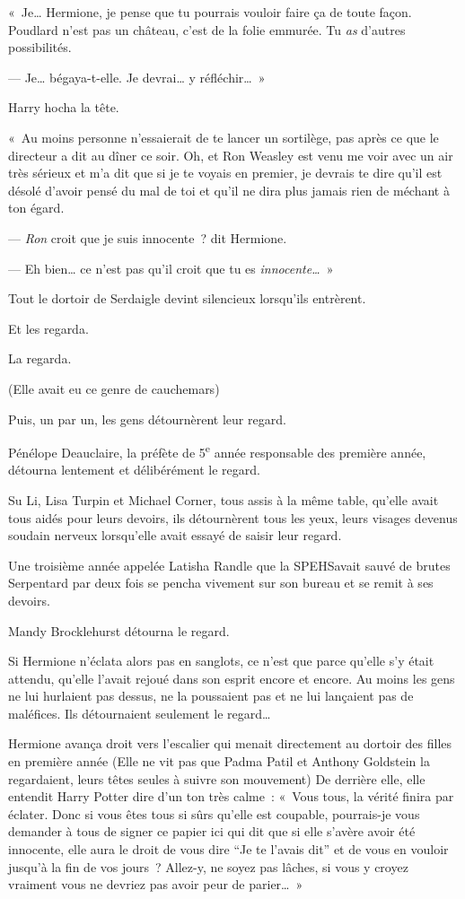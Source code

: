 «~Je… Hermione, je pense que tu pourrais vouloir faire ça de toute façon.
Poudlard n'est pas un château, c'est de la folie emmurée.
Tu \emph{as} d'autres possibilités.

--- Je… bégaya-t-elle.
Je devrai… y réfléchir…~»

Harry hocha la tête.

«~Au moins personne n'essaierait de te lancer un sortilège, pas après ce que le directeur a dit au dîner ce soir.
Oh, et Ron Weasley est venu me voir avec un air très sérieux et m'a dit que si je te voyais en premier, je devrais te dire qu'il est désolé d'avoir pensé du mal de toi et qu'il ne dira plus jamais rien de méchant à ton égard.

--- \emph{Ron} croit que je suis innocente~? dit Hermione.

--- Eh bien… ce n'est pas qu'il croit que tu es \emph{innocente…}~»

\later

Tout le dortoir de Serdaigle devint silencieux lorsqu'ils entrèrent.

Et les regarda.

La regarda.

(Elle avait eu ce genre de cauchemars)

Puis, un par un, les gens détournèrent leur regard.

Pénélope Deauclaire, la préfète de 5\textsuperscript{e} année responsable des première année, détourna lentement et délibérément le regard.

Su Li, Lisa Turpin et Michael Corner, tous assis à la même table, qu'elle avait tous aidés pour leurs devoirs, ils détournèrent tous les yeux, leurs visages devenus soudain nerveux lorsqu'elle avait essayé de saisir leur regard.

Une troisième année appelée Latisha Randle que la SPEHSavait sauvé de brutes Serpentard par deux fois se pencha vivement sur son bureau et se remit à ses devoirs.

Mandy Brocklehurst détourna le regard.

Si Hermione n'éclata alors pas en sanglots, ce n'est que parce qu'elle s'y était attendu, qu'elle l'avait rejoué dans son esprit encore et encore.
Au moins les gens ne lui hurlaient pas dessus, ne la poussaient pas et ne lui lançaient pas de maléfices.
Ils détournaient seulement le regard…

Hermione avança droit vers l'escalier qui menait directement au dortoir des filles en première année (Elle ne vit pas que Padma Patil et Anthony Goldstein la regardaient, leurs têtes seules à suivre son mouvement) De derrière elle, elle entendit Harry Potter dire d'un ton très calme~: «~Vous tous, la vérité finira par éclater.
Donc si vous êtes tous si sûrs qu'elle est coupable, pourrais-je vous demander à tous de signer ce papier ici qui dit que si elle s'avère avoir été innocente, elle aura le droit de vous dire “Je te l'avais dit” et de vous en vouloir jusqu'à la fin de vos jours~?
Allez-y, ne soyez pas lâches, si vous y croyez vraiment vous ne devriez pas avoir peur de parier…~»

